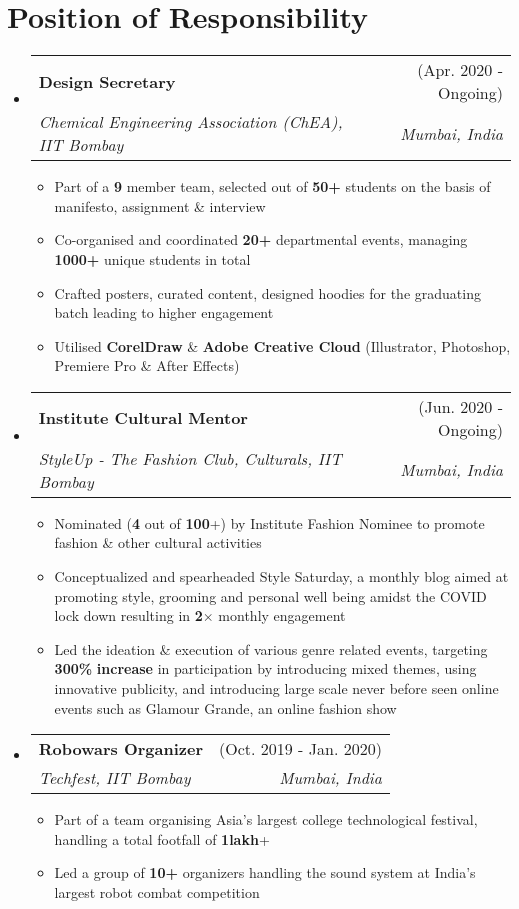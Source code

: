 \documentclass[a4paper,11pt]{article}
\makeatletter
\newcommand{\resumeItem}[1]{
  \item\small{
    {#1 \vspace{-2pt}}
  }
}
\newcommand{\resumeSubheading}[4]{
  \vspace{-2pt}\item
    \begin{tabular*}{\textwidth}[t]{l@{\extracolsep{\fill}}r}
      \textbf{#1} & #2 \\
      \textit{\small#3} & \textit{\small #4} \\
    \end{tabular*}\vspace{-7pt}
}
\newcommand{\resumeSubHeadingListStart}{\begin{itemize}[leftmargin=-0pt, label={}]}
\newcommand{\resumeSubHeadingListEnd}{\end{itemize}}
\newcommand{\resumeItemListStart}{\begin{itemize}}
\newcommand{\resumeItemListEnd}{\end{itemize}\vspace{-5pt}}
\makeatother
\begin{document}
  \section{Position of Responsibility}
    \resumeSubHeadingListStart
      
      \resumeSubheading
        {Design Secretary}{(Apr. 2020 - Ongoing)}
        {Chemical Engineering Association (ChEA), IIT Bombay}{Mumbai, India}
        \resumeItemListStart
          \resumeItem{Part of a \textbf{9} member team, selected out of \textbf{50+} students on the basis of manifesto, assignment \& interview}
          \resumeItem{Co-organised and coordinated \textbf{20+} departmental events, managing \textbf{1000+} unique students in total}
          \resumeItem{Crafted posters, curated content, designed hoodies for the graduating batch leading to higher engagement}
          \resumeItem{Utilised \textbf{CorelDraw} \& \textbf{Adobe Creative Cloud} (Illustrator, Photoshop, Premiere Pro \& After Effects)}
      \resumeItemListEnd
      \resumeSubheading
        {Institute Cultural Mentor}{(Jun. 2020 - Ongoing)}
        {StyleUp - The Fashion Club, Culturals, IIT Bombay}{Mumbai, India}
        \resumeItemListStart
          \resumeItem{Nominated (\textbf{4} out of \textbf{100}+) by Institute Fashion Nominee to promote fashion \& other cultural activities}
          \resumeItem{Conceptualized and spearheaded Style Saturday, a monthly blog aimed at promoting style, grooming and personal well being amidst the COVID lock down resulting in \textbf{2$\times$} monthly engagement}
          \resumeItem{Led the ideation \& execution of various genre related events, targeting \textbf{300\%} \textbf{increase} in participation by introducing mixed themes, using innovative publicity, and introducing large scale never before seen online events such as Glamour Grande, an online fashion show}
        \resumeItemListEnd
      \resumeSubheading
        {Robowars Organizer}{(Oct. 2019 - Jan. 2020)}
        {Techfest, IIT Bombay}{Mumbai, India}
        \resumeItemListStart
        \resumeItem{Part of a team organising Asia’s largest college technological festival, handling a total footfall of \textbf{1lakh}+}
        \resumeItem{Led a group of \textbf{10+} organizers handling the sound system at India's largest robot combat competition}
      \resumeItemListEnd
      
    \resumeSubHeadingListEnd    


\end{document}

